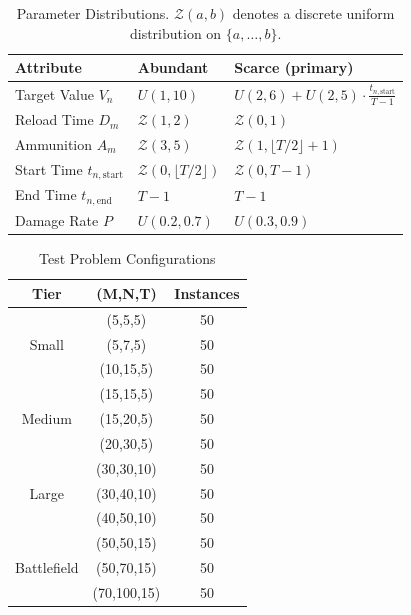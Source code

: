 \begin{table}[htbp]
\centering
\small
\caption{Parameter Distributions. $\mathcal{Z}(a,b)$ denotes a discrete uniform distribution on $\{a,\ldots,b\}$.}
\label{tab:parameter_distributions}
\begin{tabular}{l|l|l}
\hline
\textbf{Attribute} & \textbf{Abundant} & \textbf{Scarce (primary)} \\ \hline
Target Value $V_n$ & $U(1, 10)$ & $U(2,6) + U(2,5)\cdot\frac{t_{n,\text{start}}}{T-1}$ \\
Reload Time $D_m$ & $\mathcal{Z}(1, 2)$ & $\mathcal{Z}(0, 1)$ \\
Ammunition $A_m$ & $\mathcal{Z}(3, 5)$ & $\mathcal{Z}(1, \lfloor T/2\rfloor{+}1)$ \\
Start Time $t_{n,\text{start}}$ & $\mathcal{Z}(0, \lfloor T/2\rfloor)$ & $\mathcal{Z}(0, T{-}1)$ \\
End Time $t_{n,\text{end}}$ & $T{-}1$ & $T{-}1$ \\
Damage Rate $P$ & $U(0.2, 0.7)$ & $U(0.3, 0.9)$ \\ \hline
\end{tabular}
\end{table}

\begin{table}[htbp]
\centering
\small
\caption{Test Problem Configurations}
\label{tab:problem_instance_scales}
\begin{tabular}{c|c|c}
\hline
\textbf{Tier} & \textbf{(M,N,T)} & \textbf{Instances} \\ \hline
\multirow{3}{*}{Small}      & (5,5,5)    & 50 \\
                            & (5,7,5)    & 50 \\
                            & (10,15,5)  & 50 \\ \hline
\multirow{3}{*}{Medium}     & (15,15,5)  & 50 \\
                            & (15,20,5)  & 50 \\
                            & (20,30,5)  & 50 \\ \hline
\multirow{3}{*}{Large}      & (30,30,10) & 50 \\
                            & (30,40,10) & 50 \\
                            & (40,50,10) & 50 \\ \hline
\multirow{3}{*}{Battlefield} & (50,50,15) & 50 \\
                            & (50,70,15) & 50 \\
                            & (70,100,15) & 50 \\ \hline
\end{tabular}
\end{table}

